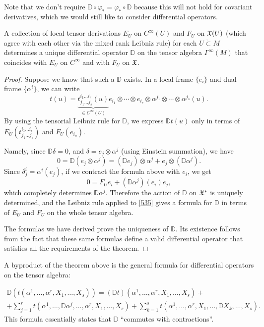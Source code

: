 Note that we don't require $\mathbb{D}\circ\varphi_\ast=\varphi_\ast\circ \mathbb{D}$ because this will not hold for covariant derivatives, which we would still like to consider differential operators.

\begin{thm}\label{Willmore}
    A collection of local tensor derivations $E_U$ on $C^\infty(U)$ and $F_U$ on $\mathfrak{X}(U)$ (which agree with each other via the mixed rank Leibniz rule) for each $U\mathring{\subset}M$ determines a unique differential operator $\mathbb{D}$ on the tensor algebra $\Gamma^\infty(M)$ that coincides with $E_U$ on $C^\infty$ and with $F_U$ on $\mathfrak{X}$.
\end{thm}
\begin{proof}
    Suppose we know that such a $\mathbb{D}$ exists. In a local frame $\{e_i\}$ and dual frame $\{\alpha^i\}$, we can write
    \[t(u)=\underbrace{t_{j_1\ldots j_s}^{i_1\ldots i_r}(u)}_{\in C^\infty(U)} e_{i_1}\otimes \cdots \otimes e_{i_r}\otimes \alpha^{j_1}\otimes \cdots\otimes \alpha^{j_s}(u).\label{535}\]
    By using the tensorial Leibniz rule for $\mathbb{D}$, we express $\mathbb{D}t(u)$ only in terms of $E_U(t_{j_1\ldots j_s}^{i_1\ldots i_r})$ and $F_U(e_{i_k})$.
    
    Namely, since $\mathbb{D}\delta=0$, and $\delta=e_j\otimes \alpha^j$ (using Einstein summation), we have 
    \[0=\mathbb{D}(e_j\otimes \alpha^j)=(\mathbb{D}e_j)\otimes \alpha^j+e_j\otimes (\mathbb{D}\alpha^j).\]
    Since $\delta^i_j=\alpha^i(e_j)$, if we contract the formula above with $e_i$, we get
    \[0=F_U e_i+(\mathbb{D}\alpha^j)(e_i) e_j,\]
    which completely determines $\mathbb{D}\alpha^j$. Therefore the action of $\mathbb{D}$ on $\mathfrak{X}^\ast$ is uniquely determined, and the Leibniz rule applied to \ref{535} gives a formula for $\mathbb{D}$ in terms of $E_U$ and $F_U$ on the whole tensor algebra.
    
    The formulas we have derived prove the uniqueness of $\mathbb{D}$. Its existence follows from the fact that these same formulas define a valid differential operator that satisfies all the requirements of the theorem.
\end{proof}
\begin{cor}\label{cor willmore formula}
    A byproduct of the theorem above is the general formula for differential operators on the tensor algebra:

    \begin{multline}
        \mathbb{D}\left(t(\alpha^1,\ldots,\alpha^r,X_1,\ldots,X_s)\right)=(\mathbb{D}t)(\alpha^1,\ldots,\alpha^r,X_1,\ldots,X_s)+\\+\sum_{j=1}^r t\left(\alpha^1,\ldots,\mathbb{D}\alpha^j,\ldots,\alpha^r,X_1,\ldots,X_s\right)+\sum_{k=1}^s t\left(\alpha^1,\ldots,\alpha^r,X_1,\ldots,\mathbb{D}X_k,\ldots,X_s\right).
    \end{multline}
    This formula essentially states that $\mathbb{D}$ ``commutes with contractions''.
\end{cor}


